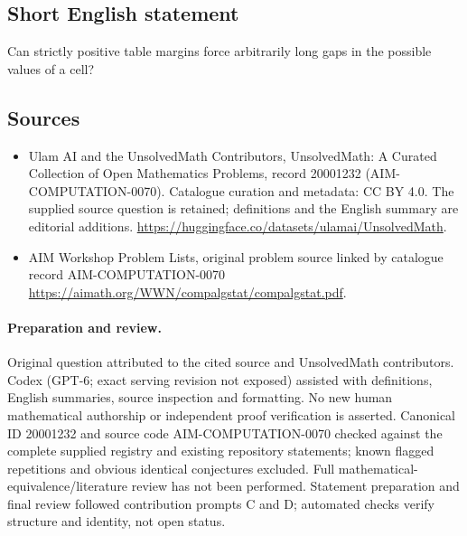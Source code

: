 \documentclass[11pt]{article}
\begin{document}
\subsection{Short English statement}
Can strictly positive table margins force arbitrarily long gaps in the possible values of a cell?
\subsection{Sources}
\begin{itemize}
\item[\hypertarget{source:20001232:1}{S1}] Ulam AI and the UnsolvedMath Contributors, UnsolvedMath: A Curated Collection of Open Mathematics Problems, record 20001232 (AIM-COMPUTATION-0070). Catalogue curation and metadata: CC BY 4.0. The supplied source question is retained; definitions and the English summary are editorial additions.
\url{https://huggingface.co/datasets/ulamai/UnsolvedMath}.
\item[\hypertarget{source:20001232:2}{S2}] AIM Workshop Problem Lists, original problem source linked by catalogue record AIM-COMPUTATION-0070
\url{https://aimath.org/WWN/compalgstat/compalgstat.pdf}.
\end{itemize}
\paragraph{Preparation and review.}
Original question attributed to the cited source and UnsolvedMath contributors. Codex (GPT-6; exact serving revision not exposed) assisted with definitions, English summaries, source inspection and formatting. No new human mathematical authorship or independent proof verification is asserted. Canonical ID 20001232 and source code AIM-COMPUTATION-0070 checked against the complete supplied registry and existing repository statements; known flagged repetitions and obvious identical conjectures excluded. Full mathematical-equivalence/literature review has not been performed. Statement preparation and final review followed contribution prompts C and D; automated checks verify structure and identity, not open status.
\label{end:20001232}
\end{document}
